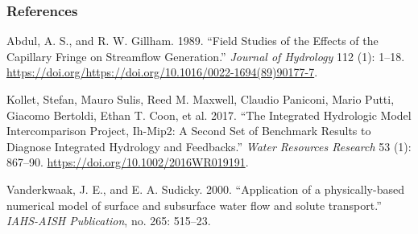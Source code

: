 \documentclass[
]{article}
\newlength{\cslhangindent}
\newenvironment{cslreferences}%
  {\setlength{\parindent}{0pt}%
  \everypar{\setlength{\hangindent}{\cslhangindent}}\ignorespaces}%
  {\par}
\begin{document}
\hypertarget{references}{%
\subsubsection*{References}\label{references}}

\hypertarget{refs}{}
\begin{cslreferences}
\leavevmode\hypertarget{ref-Abdul1989}{}%
Abdul, A. S., and R. W. Gillham. 1989. ``Field Studies of the Effects of
the Capillary Fringe on Streamflow Generation.'' \emph{Journal of
Hydrology} 112 (1): 1--18.
\url{https://doi.org/https://doi.org/10.1016/0022-1694(89)90177-7}.

\leavevmode\hypertarget{ref-Kollet2017}{}%
Kollet, Stefan, Mauro Sulis, Reed M. Maxwell, Claudio Paniconi, Mario
Putti, Giacomo Bertoldi, Ethan T. Coon, et al. 2017. ``The Integrated
Hydrologic Model Intercomparison Project, Ih-Mip2: A Second Set of
Benchmark Results to Diagnose Integrated Hydrology and Feedbacks.''
\emph{Water Resources Research} 53 (1): 867--90.
\url{https://doi.org/10.1002/2016WR019191}.

\leavevmode\hypertarget{ref-Vanderkwaak2000}{}%
Vanderkwaak, J. E., and E. A. Sudicky. 2000. ``Application of a
physically-based numerical model of surface and subsurface water flow
and solute transport.'' \emph{IAHS-AISH Publication}, no. 265: 515--23.
\end{cslreferences}
\end{document}

